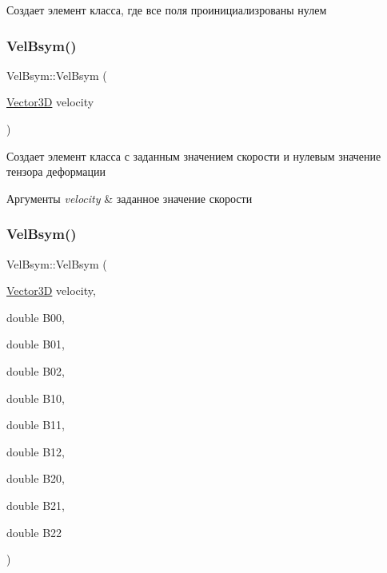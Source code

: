Создает элемент класса, где все поля проинициализрованы нулем \mbox{\label{struct_vel_bsym_ade5b269a7530d543b14c273249cff251}} 
\subsubsection{\texorpdfstring{Vel\+Bsym()}{VelBsym()}\hspace{0.1cm}{\footnotesize\ttfamily [2/3]}}
{\footnotesize\ttfamily Vel\+Bsym\+::\+Vel\+Bsym (\begin{DoxyParamCaption}\item[{\mbox{\hyperlink{class_vector3_d}{Vector3D}}}]{velocity }\end{DoxyParamCaption})}

Создает элемент класса с заданным значением скорости и нулевым значение тензора деформации 
\begin{DoxyParams}{Аргументы}
{\em velocity} & заданное значение скорости \\
\hline
\end{DoxyParams}
\mbox{\label{struct_vel_bsym_a9d1a6ce0827c575a9bb137a0ffd8fc20}} 
\subsubsection{\texorpdfstring{Vel\+Bsym()}{VelBsym()}\hspace{0.1cm}{\footnotesize\ttfamily [3/3]}}
{\footnotesize\ttfamily Vel\+Bsym\+::\+Vel\+Bsym (\begin{DoxyParamCaption}\item[{\mbox{\hyperlink{class_vector3_d}{Vector3D}}}]{velocity,  }\item[{double}]{B00,  }\item[{double}]{B01,  }\item[{double}]{B02,  }\item[{double}]{B10,  }\item[{double}]{B11,  }\item[{double}]{B12,  }\item[{double}]{B20,  }\item[{double}]{B21,  }\item[{double}]{B22 }\end{DoxyParamCaption})}

